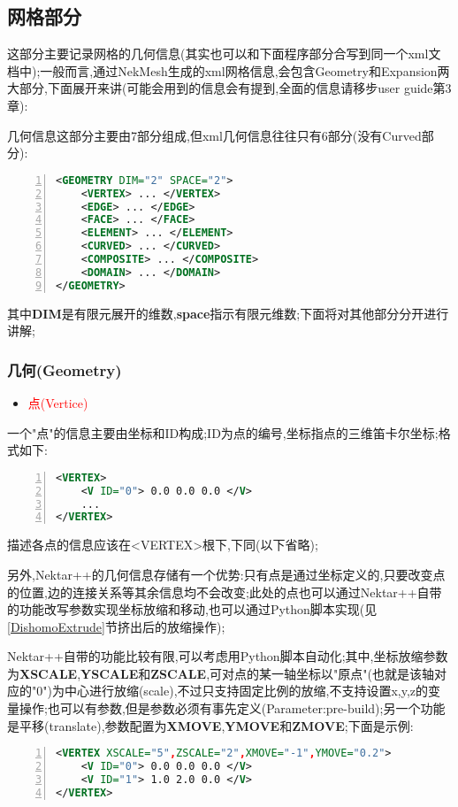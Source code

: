\subsection{网格部分}
这部分主要记录网格的几何信息(其实也可以和下面程序部分合写到同一个xml文档中);一般而言,通过NekMesh生成的xml网格信息,会包含Geometry和Expansion两大部分,下面展开来讲(可能会用到的信息会有提到,全面的信息请移步user guide第3章):\par
几何信息这部分主要由7部分组成,但xml几何信息往往只有6部分(没有Curved部分):
\begin{lstlisting}[frame=single,numbers=left,language=XML]
<GEOMETRY DIM="2" SPACE="2">
	<VERTEX> ... </VERTEX>
	<EDGE> ... </EDGE>
	<FACE> ... </FACE>
	<ELEMENT> ... </ELEMENT>
	<CURVED> ... </CURVED>
	<COMPOSITE> ... </COMPOSITE>
	<DOMAIN> ... </DOMAIN>
</GEOMETRY>
\end{lstlisting}
\par
其中\textbf{DIM}是有限元展开的维数,\textbf{space}指示有限元维数;下面将对其他部分分开进行讲解;

\subsubsection{几何(Geometry)}
\begin{itemize}
	\item{\textcolor{red}{点(Vertice)}}
\end{itemize}

一个"点"的信息主要由坐标和ID构成;ID为点的编号,坐标指点的三维笛卡尔坐标;格式如下:
\begin{lstlisting}[frame=single,numbers=left,language=XML]
<VERTEX>
	<V ID="0"> 0.0 0.0 0.0 </V>
	...
</VERTEX>
\end{lstlisting}
\par
描述各点的信息应该在<VERTEX>根下,下同(以下省略);\par
另外,Nektar++的几何信息存储有一个优势:只有点是通过坐标定义的,只要改变点的位置,边的连接关系等其余信息均不会改变;此处的点也可以通过Nektar++自带的功能改写参数实现坐标放缩和移动,也可以通过Python脚本实现(见\ref{DishomoExtrude}节挤出后的放缩操作);\par
Nektar++自带的功能比较有限,可以考虑用Python脚本自动化;其中,坐标放缩参数为\textbf{XSCALE},\textbf{YSCALE}和\textbf{ZSCALE},可对点的某一轴坐标以"原点"(也就是该轴对应的"0")为中心进行放缩(scale),不过只支持固定比例的放缩,不支持设置x,y,z的变量操作;也可以有参数,但是参数必须有事先定义(Parameter:pre-build);另一个功能是平移(translate),参数配置为\textbf{XMOVE},\textbf{YMOVE}和\textbf{ZMOVE};下面是示例:
\begin{lstlisting}[frame=single,numbers=left,language=XML]
<VERTEX XSCALE="5",ZSCALE="2",XMOVE="-1",YMOVE="0.2">
	<V ID="0"> 0.0 0.0 0.0 </V>
	<V ID="1"> 1.0 2.0 0.0 </V>
</VERTEX>
\end{lstlisting}
\par

